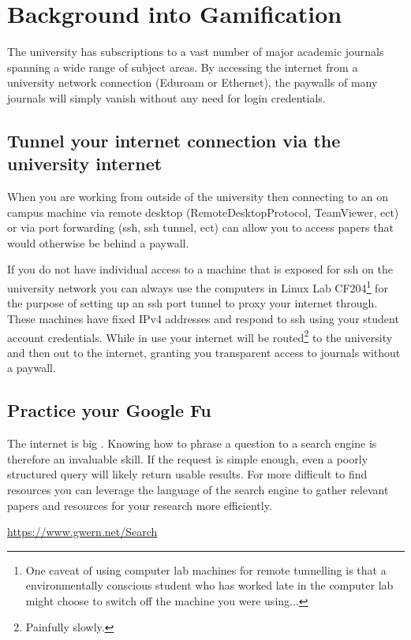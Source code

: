 \chapter{Background into Gamification}
	\label{chap:resources}
		
	The university has subscriptions to a vast number of major academic journals spanning a wide range of subject areas. By accessing the internet from a university network connection (Eduroam or Ethernet), the paywalls of many journals will simply vanish without any need for login credentials.

	\section{Tunnel your internet connection via the university internet}
		When you are working from outside of the university then connecting to an on campus machine via remote desktop (RemoteDesktopProtocol, TeamViewer, ect) or via port forwarding (ssh, ssh tunnel, ect) can allow you to access papers that would otherwise be behind a paywall. 
		
		If you do not have individual access to a machine that is exposed for ssh on the university network you can always use the computers in Linux Lab CF204\footnote{One caveat of using computer lab machines for remote tunnelling is that a environmentally conscious student who has worked late in the computer lab might choose to switch off the machine you were using...} for the purpose of setting up an ssh port tunnel to proxy your internet through. These machines have fixed IPv4 addresses and respond to ssh using your student account credentials. While in use your internet will be routed\footnote{Painfully slowly.} to the university and then out to the internet, granting you transparent access to journals without a paywall.

	\section{Practice your Google Fu}
		\label{sec:google_fu}
		The internet is big \cite{sizeofinternet}. Knowing how to phrase a question to a search engine is therefore an invaluable skill. If the request is simple enough, even a poorly structured query will likely return usable results. For more difficult to find resources you can leverage the language of the search engine to gather relevant papers and resources for your research more efficiently. 
		
		\begin{center}
		{\small \url{https://www.gwern.net/Search}}
		\end{center}
		
